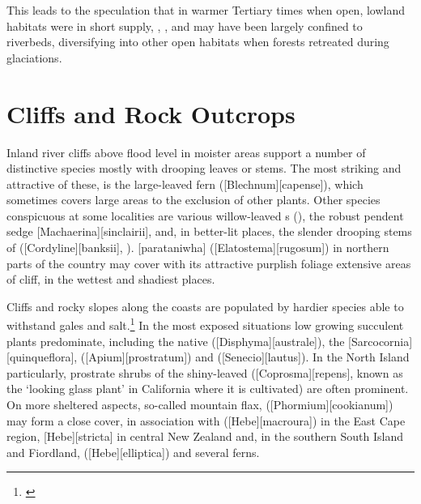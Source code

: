 This leads to the speculation that in warmer Tertiary times when open, lowland habitats were in short supply, , , and  may have been largely confined to riverbeds, diversifying into other open habitats when forests retreated during glaciations.

\section{Cliffs and Rock Outcrops}

Inland river cliffs above flood level in moister areas support a number of distinctive species mostly with drooping leaves or stems.
The most striking and attractive of these, is the large-leaved fern  ([Blechnum][capense]), which sometimes covers large areas to the exclusion of other plants.
Other species conspicuous at some localities are various willow-leaved s (), the robust pendent sedge [Machaerina][sinclairii], and, in better-lit places, the slender drooping stems of  ([Cordyline][banksii], ).
[parataniwha] ([Elatostema][rugosum]) in northern parts of the country may cover with its attractive purplish foliage extensive areas of cliff, in the wettest and shadiest places.

Cliffs and rocky slopes along the coasts are populated by hardier species able to withstand gales and salt.\footnote{\cite{moore1963plants}}
In the most exposed situations low growing succulent plants predominate, including the native  ([Disphyma][australe]), the  [Sarcocornia][quinqueflora],  ([Apium][prostratum]) and  ([Senecio][lautus]).
In the North Island particularly, prostrate shrubs of the shiny-leaved  ([Coprosma][repens], known as the `looking glass plant' in California where it is cultivated) are often prominent.
On more sheltered aspects, so-called mountain flax,  ([Phormium][cookianum]) may form a close cover, in association with  ([Hebe][macroura]) in the East Cape region, [Hebe][stricta] in central New Zealand and, in the southern South Island and Fiordland,  ([Hebe][elliptica]) and several ferns.

